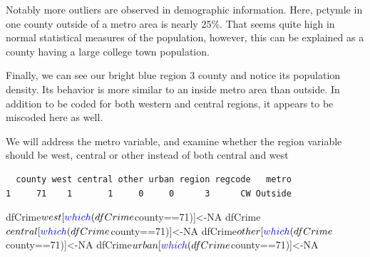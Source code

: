 \documentclass[]{article}
\newenvironment{Shaded}{}{}
\newcommand{\DecValTok}[1]{#1}
\newcommand{\KeywordTok}[1]{\textcolor[rgb]{0.00,0.00,1.00}{#1}}
\newcommand{\NormalTok}[1]{#1}
\newcommand{\OperatorTok}[1]{#1}
\newcommand{\OtherTok}[1]{\textcolor[rgb]{1.00,0.25,0.00}{#1}}
\newcommand{\StringTok}[1]{\textcolor[rgb]{0.00,0.50,0.50}{#1}}
\begin{document}
Notably more outliers are observed in demographic information. Here,
pctymle in one county outside of a metro area is nearly 25\%. That seems
quite high in normal statistical measures of the population, however,
this can be explained as a county having a large college town
population.

Finally, we can see our bright blue region 3 county and notice its
population density. Its behavior is more similar to an inside metro area
than outside. In addition to be coded for both western and central
regions, it appears to be miscoded here as well.

We will address the metro variable, and examine whether the region
variable should be west, central or other instead of both central and
west

\begin{Shaded}
\end{Shaded}

\begin{verbatim}
  county west central other urban region regcode   metro
1     71    1       1     0     0      3      CW Outside
\end{verbatim}

\begin{Shaded}
\begin{Highlighting}[]
\NormalTok{dfCrime}\OperatorTok{$}\NormalTok{west[}\KeywordTok{which}\NormalTok{(dfCrime}\OperatorTok{$}\NormalTok{county}\OperatorTok{==}\DecValTok{71}\NormalTok{)]<-}\OtherTok{NA}
\NormalTok{dfCrime}\OperatorTok{$}\NormalTok{central[}\KeywordTok{which}\NormalTok{(dfCrime}\OperatorTok{$}\NormalTok{county}\OperatorTok{==}\DecValTok{71}\NormalTok{)]<-}\OtherTok{NA}
\NormalTok{dfCrime}\OperatorTok{$}\NormalTok{other[}\KeywordTok{which}\NormalTok{(dfCrime}\OperatorTok{$}\NormalTok{county}\OperatorTok{==}\DecValTok{71}\NormalTok{)]<-}\OtherTok{NA}
\NormalTok{dfCrime}\OperatorTok{$}\NormalTok{urban[}\KeywordTok{which}\NormalTok{(dfCrime}\OperatorTok{$}\NormalTok{county}\OperatorTok{==}\DecValTok{71}\NormalTok{)]<-}\OtherTok{NA}
\end{Highlighting}
\end{Shaded}
\end{document}
